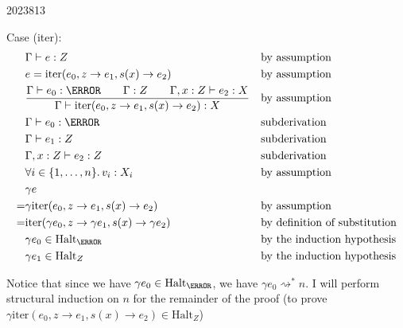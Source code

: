 \documentclass[10pt,\jkfside,a4paper]{article}
\begin{document}
\begin{enumerate}
\begin{examquestion}{2023}{8}{13}
\begin{enumerate}[label=$(\alph*)$]
            Case (iter):
            \begin{align*}
                & \Gamma \vdash e: Z && \text{by assumption} \\
                & e = \mathrm{iter}(e_0, z \to e_1, s(x) \to e_2) && \text{by assumption} \\
                & \dfrac{
                    \Gamma \vdash e_0: \N \qquad \Gamma: Z \qquad \Gamma, x: Z \vdash e_2 : X
                }{
                    \Gamma \vdash \mathrm{iter}(e_0, z \to e_1, s(x) \to e_2): X
                } && \text{by assumption} \\
                & \Gamma \vdash e_0: \N && \text{subderivation} \\
                & \Gamma \vdash e_1: Z && \text{subderivation} \\
                & \Gamma, x: Z \vdash e_2: Z && \text{subderivation} \\
                & \forall i \in \{1, \ldots, n\}\ldotp v_i: X_i && \text{by assumption} \\
                & \gamma e \\
                =& \gamma\mathrm{iter}(e_0, z \to e_1, s(x) \to e_2) && \text{by assumption} \\
                =& \mathrm{iter}(\gamma e_0, z \to \gamma e_1, s(x) \to \gamma e_2) && \text{by definition of substitution} \\
                & \gamma e_0 \in \mathrm{Halt}_{\N} && \text{by the induction hypothesis} \\
                & \gamma e_1 \in \mathrm{Halt}_Z && \text{by the induction hypothesis} \\
            \end{align*}

            Notice that since we have $\gamma e_0 \in \mathrm{Halt}_{\N}$, we have $\gamma e_0 \rightsquigarrow^* n$. I will perform structural induction on $n$ for the remainder of the proof (\ie to prove
            $\gamma \mathrm{iter}(e_0, z \to e_1, s(x) \to e_2) \in \mathrm{Halt}_Z$)


\end{enumerate}
\end{examquestion}
\end{enumerate}
\end{document}
